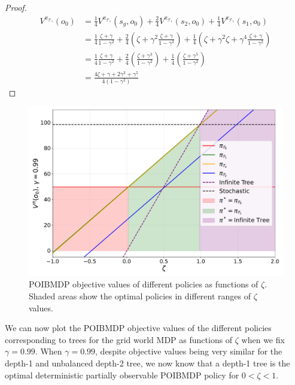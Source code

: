 \begin{proof}
\begin{align*}
    V^{\pi_{\mathcal{T}_1}} (o_0) &= \frac{1}{4} V^{\pi_{\mathcal{T}_1}} (s_g, o_0) + \frac{2}{4} V^{\pi_{\mathcal{T}_1}} (s_2, o_0) + \frac{1}{4} V^{\pi_{\mathcal{T}_1}} (s_1, o_0) \\
    &= \frac{1}{4} \frac{\zeta + \gamma}{1 - \gamma^2} + \frac{2}{4} (\zeta + \gamma^2 \frac{\zeta + \gamma}{1 - \gamma^2}) + \frac{1}{4} (\zeta + \gamma^2 \zeta + \gamma^4 \frac{\zeta + \gamma}{1 - \gamma^2}) \\
    &= \frac{1}{4} \frac{\zeta + \gamma}{1 - \gamma^2} + \frac{2}{4} (\frac{\zeta + \gamma ^ 3}{1-\gamma^2}) + \frac{1}{4}(\frac{\zeta+\gamma^5}{1-\gamma^2}) \\
    &= \frac{4\zeta + \gamma + 2\gamma^3 + \gamma^5}{4(1-\gamma^2)}
\end{align*}
\end{proof}


\begin{figure}
    \centering
    \includegraphics[width=1\textwidth]{images/images_part1/objective_values_plot.pdf}
    \caption{POIBMDP objective values of different policies as functions of $\zeta$. Shaded areas show the optimal policies in different ranges of $\zeta$ values.}\label{fig:objectives}
\end{figure}

We can now plot the POIBMDP objective values of the different policies corresponding to trees for the grid world MDP as functions of $\zeta$ when we fix $\gamma=0.99$. 
When $\gamma=0.99$, despite objective values being very similar for the depth-1 and unbalanced depth-2 tree, we now know that {\color{blue}a depth-1 tree is the optimal deterministic partially observable POIBMDP policy for $0< \zeta < 1$}.

